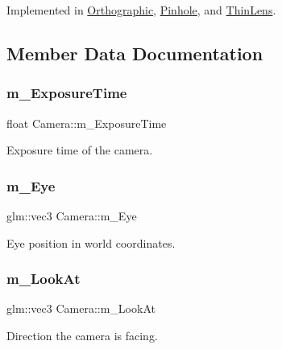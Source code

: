 Implemented in \hyperlink{class_orthographic_a0d7ee7bfe619febed73725b99d2cc0b0}{Orthographic}, \hyperlink{class_pinhole_a722af80f738cf4e8adba65926ffea9c9}{Pinhole}, and \hyperlink{class_thin_lens_af33d499e8fdbdbd196ba3a9b28bdaf5c}{Thin\+Lens}.



\subsection{Member Data Documentation}
\hypertarget{class_camera_a9930c812c2015bf0f3746c18ff2d3e3b}{}\label{class_camera_a9930c812c2015bf0f3746c18ff2d3e3b} 
\subsubsection{\texorpdfstring{m\+\_\+\+Exposure\+Time}{m\_ExposureTime}}
{\footnotesize\ttfamily float Camera\+::m\+\_\+\+Exposure\+Time\hspace{0.3cm}{\ttfamily [protected]}}

Exposure time of the camera. \hypertarget{class_camera_afea4cf59abeabef0ac61915bccd1c35c}{}\label{class_camera_afea4cf59abeabef0ac61915bccd1c35c} 
\subsubsection{\texorpdfstring{m\+\_\+\+Eye}{m\_Eye}}
{\footnotesize\ttfamily glm\+::vec3 Camera\+::m\+\_\+\+Eye\hspace{0.3cm}{\ttfamily [protected]}}

Eye position in world coordinates. \hypertarget{class_camera_a64c0c57201219d5e9965298a19007a61}{}\label{class_camera_a64c0c57201219d5e9965298a19007a61} 
\subsubsection{\texorpdfstring{m\+\_\+\+Look\+At}{m\_LookAt}}
{\footnotesize\ttfamily glm\+::vec3 Camera\+::m\+\_\+\+Look\+At\hspace{0.3cm}{\ttfamily [protected]}}

Direction the camera is facing. \hypertarget{class_camera_aac745762c9d82b5cdfdcd48c7902b919}{}\label{class_camera_aac745762c9d82b5cdfdcd48c7902b919} 
